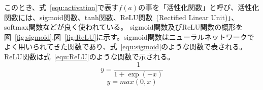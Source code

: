 このとき、式~\eqref{equ:activation}で表す$f(a)$の事を「活性化関数」と呼び、活性化関数には、sigmoid関数、tanh関数、ReLU関数~(Rectified Linear Unit)」、softmax関数などが良く使われている。
sigmoid関数及びReLU関数の概形を図~\ref{fig:sigmoid},図~\ref{fig:ReLU}に示す。sigmoid関数はニューラルネットワークでよく用いられてきた関数であり、式~\eqref{equ:sigmoid}のような関数で表される。ReLU関数は式~\eqref{equ:ReLU}のような関数で示される。
\begin{equation}
    y = \frac{1}{1+\exp(-x)}
    \label{equ:sigmoid}
\end{equation}
\begin{equation}
    y = max(0,x)
    \label{equ:ReLU}
\end{equation}


